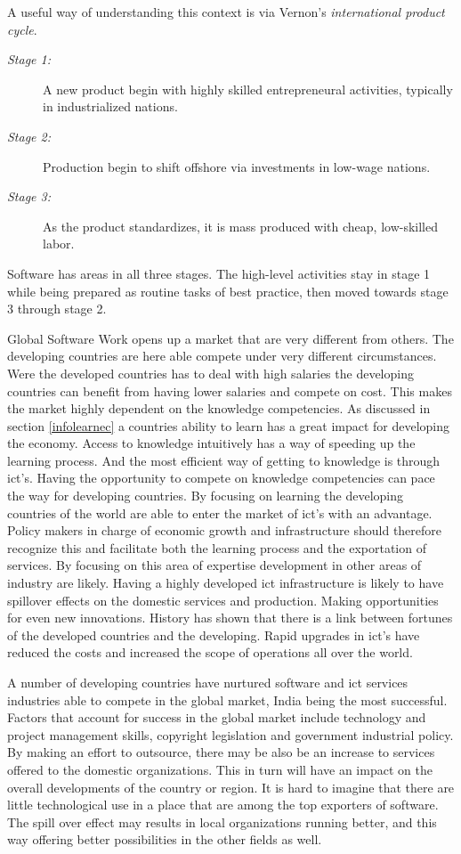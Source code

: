 A useful way of understanding this context is via Vernon's \textit{international product cycle}.
\begin{description}
\item[\textit{Stage 1:}]\hfill
A new product begin with highly skilled entrepreneural activities, typically in industrialized nations.
\item[\textit{Stage 2:}]\hfill
Production begin to shift offshore via investments in low-wage nations.
\item[\textit{Stage 3:}]\hfill
As the product standardizes, it is mass produced with cheap, low-skilled labor.
\end{description}


Software has areas in all three stages. The high-level activities stay in stage 1 while being prepared as routine tasks of best practice, then moved towards stage 3 through stage 2.

Global Software Work opens up a market that are very different from others.
The developing countries are here able compete under very different circumstances.
Were the developed countries has to deal with high salaries the developing countries can benefit from having lower salaries and compete on cost. This makes the market highly dependent on the knowledge competencies. As discussed in section \ref{infolearnec} a countries ability to learn has a great impact for developing the economy. Access to knowledge intuitively has a way of speeding up the learning process. And the most efficient way of getting to knowledge is through \gls{ict}'s. 
Having the opportunity to compete on knowledge competencies can pace the way for developing countries. By focusing on learning the developing countries of the world are able to enter the market of \gls{ict}'s with an advantage. Policy makers in charge of economic growth and infrastructure should therefore recognize this and facilitate both the learning process and the exportation of services. 
By focusing on this area of expertise development in other areas of industry are likely.
Having a highly developed \gls{ict} infrastructure is likely to have spillover effects on the domestic services and production. Making opportunities for even new innovations. 
History has shown that there is a link between fortunes of the developed countries and the developing. Rapid upgrades in \gls{ict}'s have reduced the costs and increased the scope of operations all over the world. 

A number of developing countries have nurtured software and \gls{ict} services industries able to compete in the global market, India being the most successful. 
Factors that account for success in the global market include technology and project management skills, copyright legislation and government industrial policy. By making an effort to outsource, there may be also be an increase to services offered to the domestic organizations. This in turn will have an impact on the overall developments of the country or region. It is hard to imagine that there are little technological use in a place that are among the top exporters of software. The spill over effect may results in local organizations running better, and this way offering better possibilities in the other fields as well.

\cite{ca:isdc}
\cite{sbs:gio}
\cite{offit:paan}
